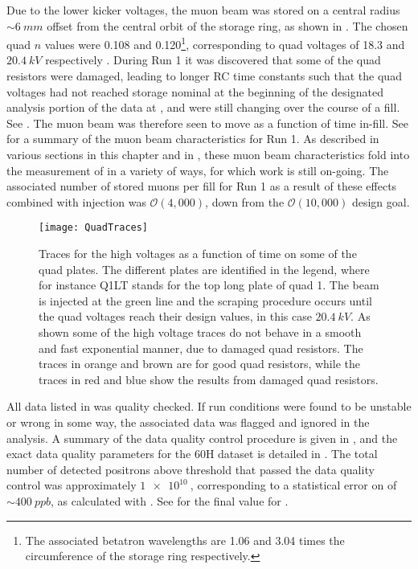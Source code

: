 Due to the lower kicker voltages, the muon beam was stored on a central radius $\sim\SI{6}{mm}$ offset from the central orbit of the storage ring, as shown in . The chosen quad $n$ values were 0.108 and 0.120\footnote{The associated betatron wavelengths are 1.06 and 3.04 times the circumference of the storage ring respectively.}, corresponding to quad voltages of 18.3 and $\SI{20.4}{kV}$ respectively \cite{tunetable}. During Run 1 it was discovered that some of the quad resistors were damaged, leading to longer RC time constants such that the quad voltages had not reached storage nominal at the beginning of the designated analysis portion of the data at , and were still changing over the course of a fill. See . The muon beam was therefore seen to move as a function of time in-fill. See  for a summary of the muon beam characteristics for Run 1. As described in various sections in this chapter and in , these muon beam characteristics fold into the measurement of \gmtwo in a variety of ways, for which work is still on-going. The associated number of stored muons per fill for Run 1 as a result of these effects combined with injection was $\mathcal{O}(4,000)$, down from the $\mathcal{O}(10,000)$ design goal. 

\begin{figure}
    \centering
    \texttt{[image: QuadTraces]}
    \caption[Electrostatic quadrupole high voltage traces]{Traces for the high voltages as a function of time on some of the quad plates. The different plates are identified in the legend, where for instance Q1LT stands for the top long plate of quad 1. The beam is injected at the green line and the scraping procedure occurs until the quad voltages reach their design values, in this case $\SI{20.4}{kV}$. As shown some of the high voltage traces do not behave in a smooth and fast exponential manner, due to damaged quad resistors. The traces in orange and brown are for good quad resistors, while the traces in red and blue show the results from damaged quad resistors.}
    \label{fig:QuadTraces}
\end{figure}


All data listed in  was quality checked. If run conditions were found to be unstable or wrong in some way, the associated data was flagged and ignored in the analysis. A summary of the data quality control procedure is given in , and the exact data quality parameters for the 60H dataset is detailed in . The total number of detected positrons above threshold that passed the data quality control was approximately $\SI{1e10}{}$, corresponding to a statistical error on \wa of $\sim\SI{400}{ppb}$, as calculated with . See  for the final value for \wa.


